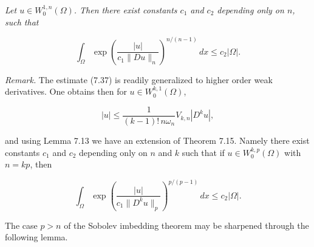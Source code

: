 \begin{theorem}\label{gt:thm-sobolev-moser-trudinger}
\emph{Let $u\in W^{1,n}_0(\Omega)$. Then there exist constants $c_1$ and $c_2$ depending only on $n$, such that}

\begin{equation}
\tag{7.38}
\int_\Omega \exp\!\left(\frac{|u|}{c_1\|Du\|_n}\right)^{n/(n-1)}\,dx\leq c_2|\Omega|.
\end{equation}

\emph{Remark.} The estimate (7.37) is readily generalized to higher order weak derivatives. One obtains then for $u\in W^{k,1}_0(\Omega)$,

\begin{equation}
\tag{7.39}
|u|\leq \frac{1}{(k-1)! \, n \omega_n} V_{k,n}|D^k u|,
\end{equation}

and using Lemma 7.13 we have an extension of Theorem 7.15. Namely there exist constants $c_1$ and $c_2$ depending only on $n$ and $k$ such that if $u\in W^{k,p}_0(\Omega)$ with $n=kp$, then

\begin{equation}
\tag{7.40}
\int_\Omega \exp\!\left(\frac{|u|}{c_1\|D^k u\|_p}\right)^{p/(p-1)}\,dx\leq c_2|\Omega|.
\end{equation}

The case $p>n$ of the Sobolev imbedding theorem may be sharpened through the following lemma.

\end{theorem}

